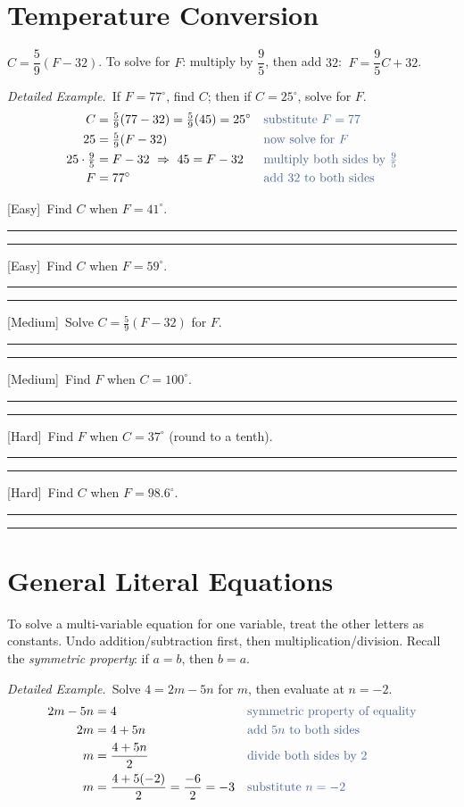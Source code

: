 \documentclass[11pt]{article}
\newcommand{\E}{\textcolor{levE}{\small[Easy]}\ }
\newcommand{\M}{\textcolor{levM}{\small[Medium]}\ }
\newcommand{\Hd}{\textcolor{levH}{\small[Hard]}\ }
\newcommand{\example}{\textit{\textcolor{fangblue}{Detailed Example.}}\ }
\newcommand{\twolines}{\par\vspace{0.7cm}%
  \textcolor{gray!55}{\rule{\linewidth}{0.3pt}}\par\vspace{0.7cm}%
  \textcolor{gray!55}{\rule{\linewidth}{0.3pt}}\par\vspace{2mm}}
\begin{document}
\section{Temperature Conversion}
\begin{keybox}
$C = \dfrac{5}{9}(F - 32)$. \quad To solve for $F$: multiply by $\dfrac{9}{5}$, then add $32$:
$\ F = \dfrac{9}{5}C + 32$.
\end{keybox}

\example If $F = 77^\circ$, find $C$; then if $C = 25^\circ$, solve for $F$.
\begin{align*}
C &= \tfrac{5}{9}(77 - 32) = \tfrac{5}{9}(45) = 25^\circ &&\color{reasonclr}\text{substitute } F = 77\\
25 &= \tfrac{5}{9}(F - 32) &&\color{reasonclr}\text{now solve for } F\\
25 \cdot \tfrac{9}{5} &= F - 32 \ \Rightarrow\ 45 = F - 32 &&\color{reasonclr}\text{multiply both sides by } \tfrac{9}{5}\\
F &= 77^\circ &&\color{reasonclr}\text{add } 32 \text{ to both sides}
\end{align*}

\begin{prob}
\item \E Find $C$ when $F = 41^\circ$. \twolines
\item \E Find $C$ when $F = 59^\circ$. \twolines
\item \M Solve $C = \tfrac{5}{9}(F - 32)$ for $F$. \twolines
\item \M Find $F$ when $C = 100^\circ$. \twolines
\item \Hd Find $F$ when $C = 37^\circ$ (round to a tenth). \twolines
\item \Hd Find $C$ when $F = 98.6^\circ$. \twolines
\end{prob}

\section{General Literal Equations}
\begin{keybox}
To solve a multi-variable equation for one variable, treat the other letters as constants.
Undo addition/subtraction first, then multiplication/division. Recall the \emph{symmetric
property}: if $a = b$, then $b = a$.
\end{keybox}

\example Solve $4 = 2m - 5n$ for $m$, then evaluate at $n = -2$.
\begin{align*}
2m - 5n &= 4 &&\color{reasonclr}\text{symmetric property of equality}\\
2m &= 4 + 5n &&\color{reasonclr}\text{add } 5n \text{ to both sides}\\
m &= \frac{4 + 5n}{2} &&\color{reasonclr}\text{divide both sides by } 2\\
m &= \frac{4 + 5(-2)}{2} = \frac{-6}{2} = -3 &&\color{reasonclr}\text{substitute } n = -2
\end{align*}
\end{document}
